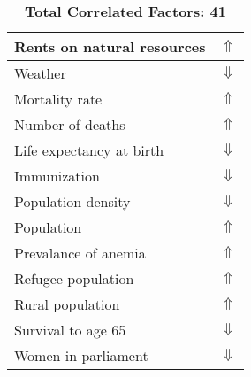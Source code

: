 \documentclass[12pt,notitlepage,oneside]{report}
\begin{document}
\begin{table}[!htb]
\begin{tabular}{|l|l|}
Rents on natural resources & $\Uparrow$\\ \hline
Weather & $\Downarrow$\\ \hline
Mortality rate & $\Uparrow$\\ \hline
Number of deaths & $\Uparrow$\\ \hline
Life expectancy at birth & $\Downarrow$\\ \hline
Immunization & $\Downarrow$\\ \hline
Population density & $\Downarrow$\\ \hline
Population & $\Uparrow$\\ \hline
Prevalance of anemia & $\Uparrow$\\ \hline
Refugee population & $\Uparrow$\\ \hline
Rural population & $\Uparrow$\\ \hline
Survival to age 65 & $\Downarrow$\\ \hline
Women in parliament & $\Downarrow$\\ \hline
\end{tabular}
\caption*{\textbf{Total Correlated Factors: 41}}
\end{table}
\clearpage
\end{document}

